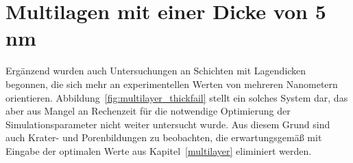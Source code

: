 \section{Multilagen mit einer Dicke von 5 nm}

Ergänzend wurden auch Untersuchungen an Schichten mit Lagendicken begonnen, die sich mehr an experimentellen Werten von mehreren Nanometern orientieren.
Abbildung~\ref{fig:multilayer_thickfail} stellt ein solches System dar, das aber aus Mangel an Rechenzeit für die notwendige Optimierung der Simulationsparameter nicht weiter untersucht wurde.
Aus diesem Grund sind auch Krater- und Porenbildungen zu beobachten, die erwartungsgemäß mit Eingabe der optimalen Werte aus Kapitel~\ref{multilayer} eliminiert werden.
